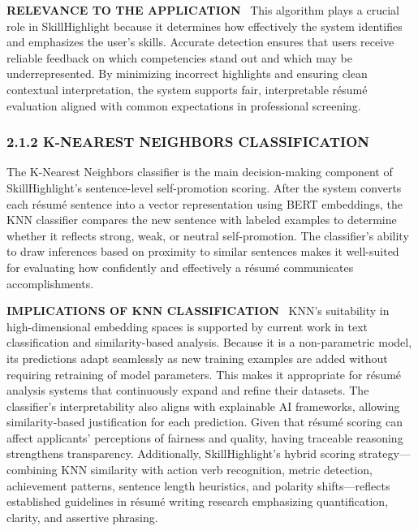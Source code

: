 \documentclass[12pt]{article}
\renewcommand{\paragraph}[1]{\noindent\textbf{\MakeUppercase{#1}}\ }
\begin{document}
\paragraph{RELEVANCE TO THE APPLICATION}
This algorithm plays a crucial role in SkillHighlight because it determines how effectively the system identifies and emphasizes the user's skills. Accurate detection ensures that users receive reliable feedback on which competencies stand out and which may be underrepresented. By minimizing incorrect highlights and ensuring clean contextual interpretation, the system supports fair, interpretable résumé evaluation aligned with common expectations in professional screening.

\subsubsection*{2.1.2 K-NEAREST NEIGHBORS CLASSIFICATION}
The K-Nearest Neighbors classifier is the main decision-making component of SkillHighlight's sentence-level self-promotion scoring. After the system converts each résumé sentence into a vector representation using BERT embeddings, the KNN classifier compares the new sentence with labeled examples to determine whether it reflects strong, weak, or neutral self-promotion. The classifier's ability to draw inferences based on proximity to similar sentences makes it well-suited for evaluating how confidently and effectively a résumé communicates accomplishments.

\paragraph{IMPLICATIONS OF KNN CLASSIFICATION}
KNN's suitability in high-dimensional embedding spaces is supported by current work in text classification and similarity-based analysis. Because it is a non-parametric model, its predictions adapt seamlessly as new training examples are added without requiring retraining of model parameters. This makes it appropriate for résumé analysis systems that continuously expand and refine their datasets. The classifier's interpretability also aligns with explainable AI frameworks, allowing similarity-based justification for each prediction. Given that résumé scoring can affect applicants' perceptions of fairness and quality, having traceable reasoning strengthens transparency. Additionally, SkillHighlight's hybrid scoring strategy—combining KNN similarity with action verb recognition, metric detection, achievement patterns, sentence length heuristics, and polarity shifts—reflects established guidelines in résumé writing research emphasizing quantification, clarity, and assertive phrasing.
\end{document}
